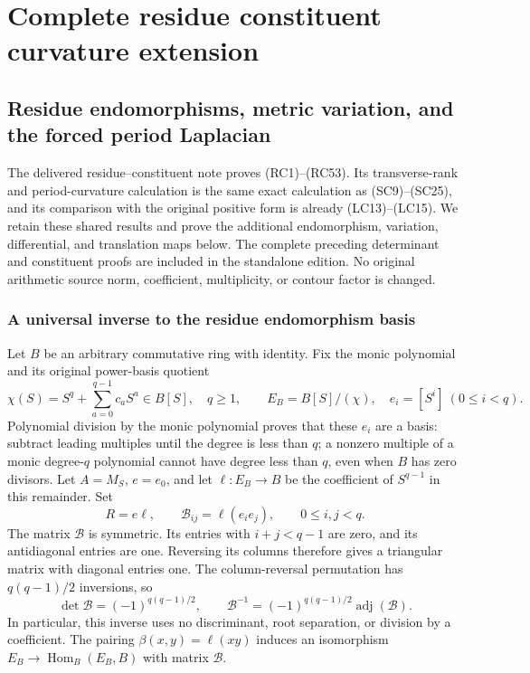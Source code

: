 \begingroup

\section{Complete residue constituent curvature extension}


\subsection{Residue endomorphisms, metric variation, and the forced period Laplacian}
\label{sec:residue-constituent-extension}

The delivered residue--constituent note proves (RC1)--(RC53).
Its transverse-rank and period-curvature calculation is the same exact
calculation as (SC9)--(SC25), and its comparison with the original positive
form is already (LC13)--(LC15). We retain these shared results and prove
the additional endomorphism, variation, differential, and translation
maps below. The complete preceding determinant and constituent proofs
are included in the standalone edition. No original arithmetic source
norm, coefficient, multiplicity, or contour factor is changed.

\subsubsection{A universal inverse to the residue endomorphism basis}

Let \(B\) be an arbitrary commutative ring with identity. Fix the monic
polynomial and its original power-basis quotient
\[
 \chi(S)=S^q+\sum_{a=0}^{q-1}c_aS^a\in B[S],\quad q\ge1,\qquad
 E_B=B[S]/(\chi),\quad e_i=[S^i]\ (0\le i<q).
 \tag{RCX1}
\]
Polynomial division by the monic polynomial proves that these \(e_i\)
are a basis: subtract leading multiples until the degree is less than
\(q\); a nonzero multiple of a monic degree-\(q\) polynomial cannot
have degree less than \(q\), even when \(B\) has zero divisors.
Let \(A=M_S\), \(e=e_0\), and let
\(\ell:E_B\to B\) be the coefficient of \(S^{q-1}\) in this remainder.
Set
\[
 R=e\ell,\qquad
 \mathcal B_{ij}=\ell(e_ie_j),\qquad 0\le i,j<q.
 \tag{RCX2}
\]
The matrix \(\mathcal B\) is symmetric. Its entries with \(i+j<q-1\)
are zero, and its antidiagonal entries are one. Reversing its columns
therefore gives a triangular matrix with diagonal entries one. The
column-reversal permutation has \(q(q-1)/2\) inversions, so
\[
 \det\mathcal B=(-1)^{q(q-1)/2},\qquad
 \mathcal B^{-1}=(-1)^{q(q-1)/2}\operatorname{adj}(\mathcal B).
 \tag{RCX3}
\]
In particular, this inverse uses no discriminant, root separation, or
division by a coefficient. The pairing
\(\beta(x,y)=\ell(xy)\) induces an isomorphism
\(E_B\to\operatorname{Hom}_B(E_B,B)\) with matrix \(\mathcal B\).

